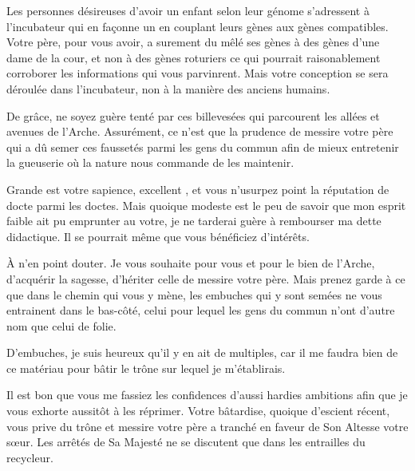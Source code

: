\begin{drama}
  Les personnes désireuses d’avoir un enfant selon leur génome s’adressent à l’incubateur qui en façonne un en couplant leurs gènes aux gènes compatibles. Votre père, pour vous avoir, a surement du mêlé ses gènes à des gènes d’une dame de la cour, et non à des gènes roturiers ce qui pourrait raisonablement corroborer les informations qui vous parvinrent. Mais votre conception se sera déroulée dans l’incubateur, non à la manière des anciens humains.

  De grâce, ne soyez guère tenté par ces billevesées qui parcourent les allées et avenues de l’Arche. Assurément, ce n’est que la prudence de messire votre père qui a dû semer ces faussetés parmi les gens du commun afin de mieux entretenir la gueuserie où la nature nous commande de les maintenir.

  \elenaspeaks Grande est votre sapience, excellent \alexas{}, et vous n’usurpez point la réputation de docte parmi les doctes. Mais quoique modeste est le peu de savoir que mon esprit faible ait pu emprunter au votre, je ne tarderai guère à rembourser ma dette didactique. Il se pourrait même que vous bénéficiez d’intérêts.

  \alexasspeaks À n’en point douter. Je vous souhaite pour vous et pour le bien de l’Arche, d’acquérir la sagesse, d’hériter celle de messire votre père. Mais prenez garde à ce que dans le chemin qui vous y mène, les embuches qui y sont semées  ne vous entrainent dans le bas-côté, celui pour lequel les gens du commun n’ont d’autre nom que celui de folie. 

  \elenaspeaks D’embuches, %
  je suis heureux qu’il y en ait de multiples, car %
  il me faudra bien de ce matériau pour bâtir le trône sur lequel je m’établirais.

  \alexasspeaks Il est bon que vous me fassiez les confidences d’aussi hardies ambitions afin que je vous exhorte aussitôt à les réprimer. Votre bâtardise, quoique d’escient récent, vous prive du trône et messire votre père a tranché en faveur de Son Altesse votre sœur. Les arrêtés de Sa Majesté ne se discutent que dans les entrailles du recycleur.


\end{drama}
